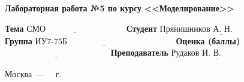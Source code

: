 \begin{titlepage}
	\begin{center}
		\Large\textbf{Лабораторная работа №5 по курсу}
		\Large\textbf{\hspace*{60pt}<<Моделирование>>}\newline\newline\newline
	\end{center}
	
	\noindent\textbf{Тема} $\underline{\text{СМО~~~~~~~~~~~~~~~~~~~~~~~~~~~~}}$\newline\newline
	\noindent\textbf{Студент} $\underline{\text{Прянишников А. Н.~~~~~~~~~~~~~~~~~~}}$\newline\newline
	\noindent\textbf{Группа} $\underline{\text{ИУ7-75Б~~~~~~~~~~~~~~~~~~~~~~~~~~~~~~~~~~~~~~}}$\newline\newline
	\noindent\textbf{Оценка (баллы)} $\underline{\text{~~~~~~~~~~~~~~~~~~~~~~~~~~~~~~~~~~~~~}}$\newline\newline
	\noindent\textbf{Преподаватель} $\underline{\text{Рудаков~И.~В.~~~~~~~~~~~~~~~}}$\newline
	
	\begin{center}
		\vfill
		Москва~---~\the\year
		~г.
	\end{center}
	\restoregeometry
\end{titlepage}